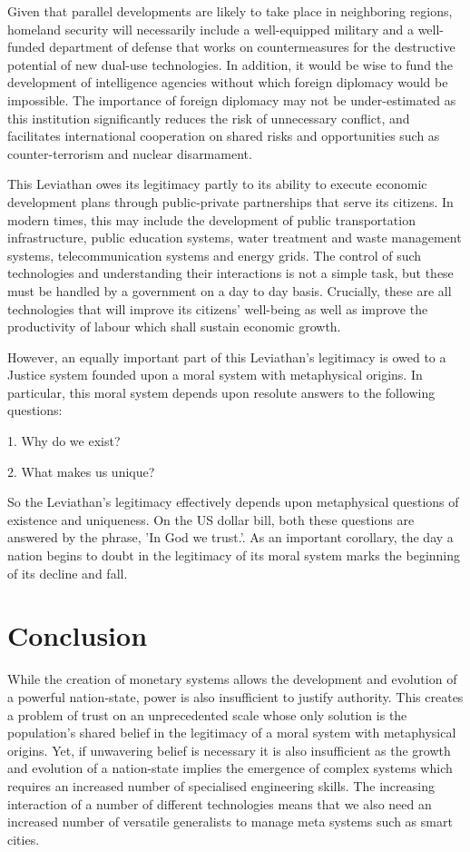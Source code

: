 \documentclass{article}
\begin{document}
Given that parallel developments are likely to take place in neighboring regions, homeland
security will necessarily include a well-equipped military and a well-funded department of
defense that works on countermeasures for the destructive potential of new dual-use technologies.
In addition, it would be wise to fund the development of intelligence agencies without which
foreign diplomacy would be impossible. The importance of foreign diplomacy may not be under-estimated as this institution significantly reduces the risk of unnecessary conflict, and
facilitates international cooperation on shared risks and opportunities such as
counter-terrorism and nuclear disarmament.

This Leviathan owes its legitimacy partly to its ability to execute economic development plans
through public-private partnerships that serve its citizens. In modern times, this may include
the development of public transportation infrastructure, public education systems, water
treatment and waste management systems, telecommunication systems and energy grids. The
control of such technologies and understanding their interactions is not a simple task, but
these must be handled by a government on a day to day basis. Crucially, these are all
technologies that will improve its citizens' well-being as well as improve the productivity of
labour which shall sustain economic growth.

However, an equally important part of this Leviathan's legitimacy is owed to a Justice
system founded upon a moral system with metaphysical origins. In particular, this moral
system depends upon resolute answers to the following questions:

1.  Why do we exist?

2. What makes us unique?

So the Leviathan's legitimacy effectively depends upon metaphysical questions of existence
and uniqueness. On the US dollar bill, both these questions are answered by the phrase, 'In God we trust.'. As an important corollary, the day a nation begins to doubt in the legitimacy of its moral system
marks the beginning of its decline and fall.


\section{Conclusion}
While the creation of monetary systems allows the development and evolution of a powerful
nation-state, power is also insufficient to justify authority. This creates a problem of trust on an unprecedented scale whose only solution is the population's shared belief in the legitimacy of a moral system with metaphysical origins. Yet, if unwavering belief is necessary it is also insufficient as the growth and evolution
of a nation-state implies the emergence of complex systems which requires an increased number
of specialised engineering skills. The increasing interaction of a number of different technologies means that we also need an increased
number of versatile generalists to manage meta systems such as smart cities. 
\end{document}
